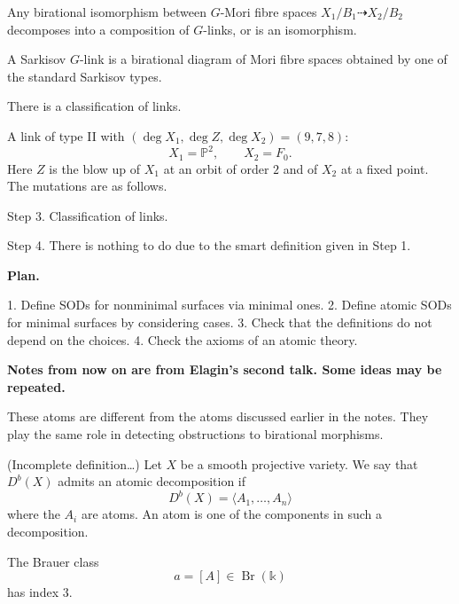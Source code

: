 \begin{theorem}
\label{theorem-any-birational}
Any birational isomorphism between
$G$-Mori fibre spaces
$X_1/B_1\dashrightarrow X_2/B_2$
decomposes into a composition of
$G$-links, or is an isomorphism.
\end{theorem}

\begin{definition}
\label{definition-sarkisov-g}
A Sarkisov $G$-link is a birational
diagram of Mori fibre spaces obtained
by one of the standard Sarkisov
types.
\end{definition}

\begin{theorem}
\label{theorem-classification}
There is a classification of links.
\end{theorem}

\begin{example}
\label{example-link-type}
A link of type II with
$(\deg X_1,\deg Z,\deg X_2)=(9,7,8)$:
\[
X_1=\mathbb P^2,\qquad X_2=F_0.
\]
Here $Z$ is the blow up of $X_1$ at
an orbit of order $2$ and of $X_2$
at a fixed point.
The mutations are as follows.
\end{example}

\medskip\noindent
Step 3.
Classification of links.

\medskip\noindent
Step 4.
There is nothing to do due to the
smart definition given in Step 1.

\medskip\noindent
{\bf Plan.}

1. Define SODs for nonminimal surfaces
via minimal ones.
2. Define atomic SODs for minimal
surfaces by considering cases.
3. Check that the definitions do not
depend on the choices.
4. Check the axioms of an atomic
theory.

\medskip\noindent
{\bf Notes from now on
are from Elagin's second talk.
Some ideas may be repeated.}

These atoms are different from the
atoms discussed earlier in the notes.
They play the same role in detecting
obstructions to birational morphisms.

\begin{definition}
(Incomplete definition…)
Let $X$ be a smooth projective variety.
We say that $D^b(X)$ admits an atomic
decomposition if
$$
D^b(X)=\langle A_1,\dots,A_n\rangle
$$
where the $A_i$ are atoms.
An atom is one of the components in
such a decomposition.
\end{definition}

The Brauer class
$$
a=[A]\in \operatorname{Br}(\mathbb k)
$$
has index $3$.

